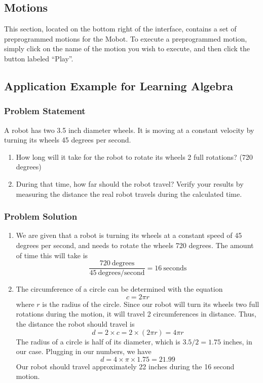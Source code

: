 \documentclass{article}
\begin{document}
\subsection{Motions}
This section, located on the bottom right of the interface, contains a set of
preprogrammed motions for the Mobot. To execute a preprogrammed motion, simply
click on the name of the motion you wish to execute, and then click the button
labeled ``Play''.

\subsection{Application Example for Learning Algebra}
\subsubsection{Problem Statement}
A robot has two 3.5 inch diameter wheels. It is moving at a constant velocity
by turning its wheels 45 degrees per second. 
\begin{enumerate}
\item How long will it take for the robot to rotate its wheels 2 full rotations? (720 degrees)
\item During that time, how far should the robot travel? Verify your results by measuring
the distance the real robot travels during the calculated time.
\end{enumerate}

\subsubsection{Problem Solution}
\begin{enumerate}
\item We are given that a robot is turning its wheels at a constant speed of 45 degrees per second, and 
needs to rotate the wheels 720 degrees. The amount of time this will take is
\begin{equation*}
\frac{720 ~\mathrm{degrees}}{45 ~\mathrm{degrees/second}} = 16 ~\mathrm{seconds}
\end{equation*}

\item The circumference of a circle can be determined with the equation
\begin{equation*}
c = 2 \pi r
\end{equation*} where $r$ is the radius of the circle. Since our robot will
turn its wheels two full rotations during the motion, it will travel 2 circumferences
in distance. Thus, the distance the robot should travel is
\begin{equation*}
d = 2 \times c = 2 \times (2 \pi r) = 4 \pi r
\end{equation*}
The radius of a circle is half of its diameter, which is $3.5 / 2 = 1.75$ inches, 
in our case. Plugging in our numbers, we have
\begin{equation*}
d = 4 \times \pi \times 1.75 = 21.99
\end{equation*}
Our robot should travel approximately 22 inches during the 16 second motion.
\end{enumerate}
\end{document}
